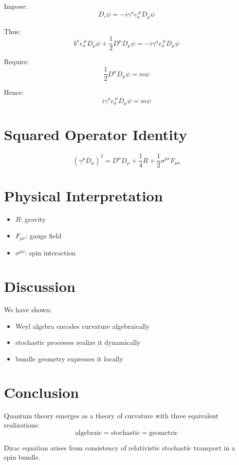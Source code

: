 \documentclass[11pt]{article}
\begin{document}
Impose:
\[
D_\tau \psi = -i \gamma^a e_a^{\ \mu} D_\mu \psi
\]

Thus:
\[
b^a e_a^{\ \mu} D_\mu \psi + \frac{1}{2} D^\mu D_\mu \psi
= -i \gamma^a e_a^{\ \mu} D_\mu \psi
\]

Require:
\[
\frac{1}{2} D^\mu D_\mu \psi = m \psi
\]

Hence:
\[
i \gamma^a e_a^{\ \mu} D_\mu \psi = m \psi
\]

\section{Squared Operator Identity}

\[
(\gamma^\mu D_\mu)^2 = D^\mu D_\mu + \frac{1}{4}R + \frac{1}{2}\sigma^{\mu\nu}F_{\mu\nu}
\]

\section{Physical Interpretation}

\begin{itemize}
\item $R$: gravity
\item $F_{\mu\nu}$: gauge field
\item $\sigma^{\mu\nu}$: spin interaction
\end{itemize}

\section{Discussion}

We have shown:
\begin{itemize}
\item Weyl algebra encodes curvature algebraically
\item stochastic processes realize it dynamically
\item bundle geometry expresses it locally
\end{itemize}

\section{Conclusion}

Quantum theory emerges as a theory of curvature with three equivalent realizations:
\[
\text{algebraic} = \text{stochastic} = \text{geometric}
\]

Dirac equation arises from consistency of relativistic stochastic transport in a spin bundle.
\end{document}
